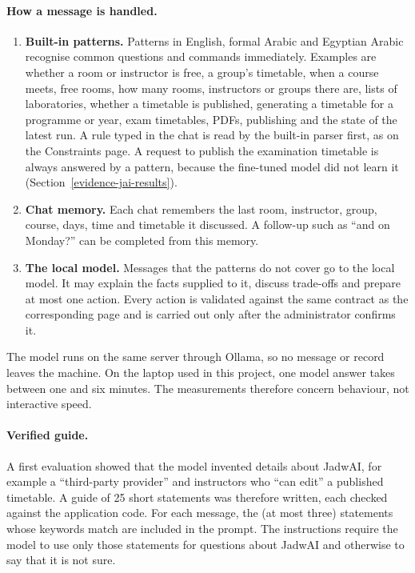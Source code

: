 \paragraph{How a message is handled.}
\begin{enumerate}
\item \textbf{Built-in patterns.} Patterns in English, formal Arabic and Egyptian Arabic recognise common questions and commands immediately. Examples are whether a room or instructor is free, a group's timetable, when a course meets, free rooms, how many rooms, instructors or groups there are, lists of laboratories, whether a timetable is published, generating a timetable for a programme or year, exam timetables, PDFs, publishing and the state of the latest run. A rule typed in the chat is read by the built-in parser first, as on the Constraints page. A request to publish the examination timetable is always answered by a pattern, because the fine-tuned model did not learn it (Section~\ref{evidence-jai-results}).
\item \textbf{Chat memory.} Each chat remembers the last room, instructor, group, course, days, time and timetable it discussed. A follow-up such as ``and on Monday?'' can be completed from this memory.
\item \textbf{The local model.} Messages that the patterns do not cover go to the local model. It may explain the facts supplied to it, discuss trade-offs and prepare at most one action. Every action is validated against the same contract as the corresponding page and is carried out only after the administrator confirms it.
\end{enumerate}
The model runs on the same server through Ollama, so no message or record leaves the machine. On the laptop used in this project, one model answer takes between one and six minutes. The measurements therefore concern behaviour, not interactive speed.

\paragraph{Verified guide.} A first evaluation showed that the model invented details about JadwAI, for example a ``third-party provider'' and instructors who ``can edit'' a published timetable. A guide of 25 short statements was therefore written, each checked against the application code. For each message, the (at most three) statements whose keywords match are included in the prompt. The instructions require the model to use only those statements for questions about JadwAI and otherwise to say that it is not sure.

